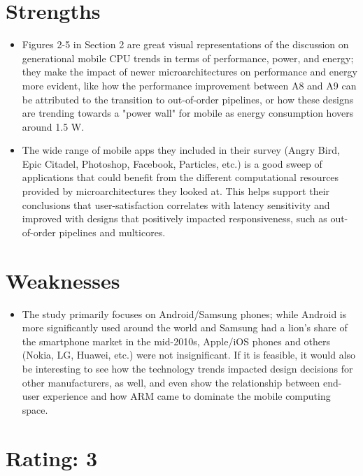 \documentclass [12pt]{article}
\begin{document}
    \section{Strengths} %
    \label{sec:strengths}
        \begin{itemize}
            \item Figures 2-5 in Section 2 are great visual representations of the discussion on generational mobile CPU trends in terms of performance, power, and energy; they make the impact of newer microarchitectures on performance and energy more evident, like how the performance improvement between A8 and A9 can be attributed to the transition to out-of-order pipelines, or how these designs are trending towards a "power wall" for mobile as energy consumption hovers around 1.5 W.
            \item The wide range of mobile apps they included in their survey (Angry Bird, Epic Citadel, Photoshop, Facebook, Particles, etc.) is a good sweep of applications that could benefit from the different computational resources provided by microarchitectures they looked at. This helps support their conclusions that user-satisfaction correlates with latency sensitivity and improved with designs that positively impacted responsiveness, such as out-of-order pipelines and multicores. 
        \end{itemize}

    \section{Weaknesses} %
    \label{sec:weaknesses}
        \begin{itemize}
            \item The study primarily focuses on Android/Samsung phones; while Android is more significantly used around the world and Samsung had a lion's share of the smartphone market in the mid-2010s, Apple/iOS phones and others (Nokia, LG, Huawei, etc.) were not insignificant. If it is feasible, it would also be interesting to see how the technology trends impacted design decisions for other manufacturers, as well, and even show the relationship between end-user experience and how ARM came to dominate the mobile computing space.
        \end{itemize}

    \section{Rating: 3} %
    \label{sec:rating}
\end{document}
